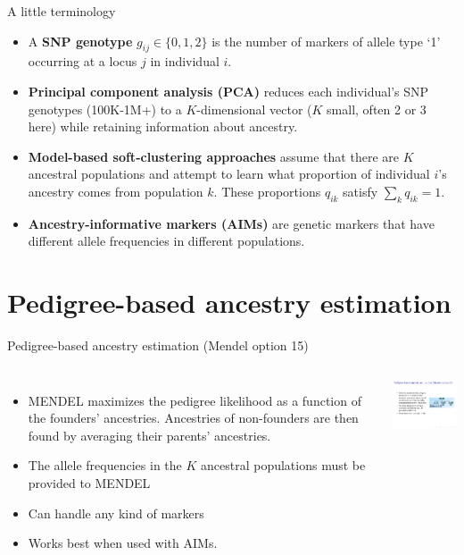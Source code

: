 \documentclass[serif,professionalfonts,svgnames]{beamer}
\begin{document}
\begin{frame}{A little terminology}
  \begin{itemize}
  \item A \textbf{SNP genotype} $g_{ij} \in \{0,1,2\}$ is the number
    of markers of allele type `1' occurring at a locus $j$ in
    individual $i$.
  \item \textbf{Principal component analysis (PCA)} reduces each
    individual's SNP genotypes (100K-1M+) to a $K$-dimensional vector
    ($K$ small, often 2 or 3 here) while retaining information about
    ancestry.
  \item \textbf{Model-based soft-clustering approaches} assume that
    there are $K$ ancestral populations and attempt to learn what
    proportion of individual $i$'s ancestry comes from population $k$.
    These proportions $q_{ik}$ satisfy $\sum_k q_{ik}=1.$
  \item \textbf{Ancestry-informative markers (AIMs)} are genetic
    markers that have different allele frequencies in different
    populations.
 \end{itemize}
  
\end{frame}
  

\section{Pedigree-based ancestry estimation}


\begin{frame}{Pedigree-based ancestry estimation (Mendel option 15)}
  \begin{columns}[c]
    \column{2.5in}  
    \begin{itemize}
    \item MENDEL maximizes the pedigree likelihood as a function of the
      founders' ancestries. Ancestries of non-founders are then found by
      averaging their parents' ancestries.
    \item The allele frequencies in the $K$ ancestral populations must be provided to MENDEL 
    \item Can handle any kind of markers 
    \item Works best when used with AIMs.
\end{itemize}

  \column{2in}
  \includegraphics[width=2in]{pedigree.pdf}
\end{columns}
    
\end{frame}
\end{document}
